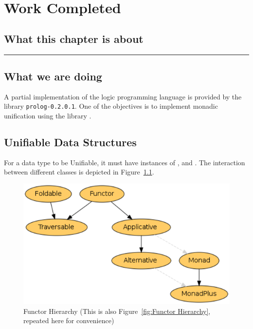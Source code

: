 \documentclass[thesis-solanki.tex]{subfiles}
\begin{document}
\chapter{Work Completed}\label{chap:workCompleted}


\section{What this chapter is about}

\noindent\rule{\textwidth}{0.5pt}


\section{What we are doing}
A partial implementation of the logic programming language  is provided by the library \texttt{prolog-0.2.0.1}. One of the 
objectives is to implement monadic unification using the library \cite{unification-fd-lib}. 


\section{Unifiable Data Structures}
For a data type to be Unifiable, it must have instances of ,  and 
.
The interaction between different classes is depicted in Figure~\ref{fig:Functor Hierarchy Redux}.

\begin{figure}[th]
\centering
\includegraphics[scale = 0.7]{FunctorHierarchy.png}
\caption{Functor Hierarchy \cite{website:foldablenadtraversable}
(This is also Figure~\ref{fig:Functor Hierarchy}, repeated here for convenience)}
\label{fig:Functor Hierarchy Redux}
\end{figure}  
\end{document}
